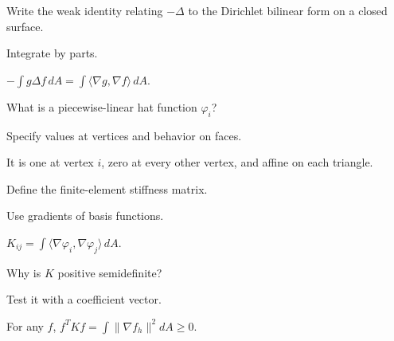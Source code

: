 \begin{exercise}\label{exr:vii41-02}
Write the weak identity relating \(-\Delta\) to the Dirichlet bilinear form on a closed surface.
\end{exercise}

\begin{hint}
Integrate by parts.
\end{hint}

\begin{solution}
\(-\int g\Delta f\,dA=\int\langle\nabla g,\nabla f\rangle\,dA\).
\end{solution}

\begin{exercise}\label{exr:vii41-03}
What is a piecewise-linear hat function \(\varphi_i\)?
\end{exercise}

\begin{hint}
Specify values at vertices and behavior on faces.
\end{hint}

\begin{solution}
It is one at vertex \(i\), zero at every other vertex, and affine on each triangle.
\end{solution}

\begin{exercise}\label{exr:vii41-04}
Define the finite-element stiffness matrix.
\end{exercise}

\begin{hint}
Use gradients of basis functions.
\end{hint}

\begin{solution}
\(K_{ij}=\int\langle\nabla\varphi_i,\nabla\varphi_j\rangle\,dA\).
\end{solution}

\begin{exercise}\label{exr:vii41-05}
Why is \(K\) positive semidefinite?
\end{exercise}

\begin{hint}
Test it with a coefficient vector.
\end{hint}

\begin{solution}
For any \(f\), \(f^TKf=\int\|\nabla f_h\|^2dA\ge0\).
\end{solution}


